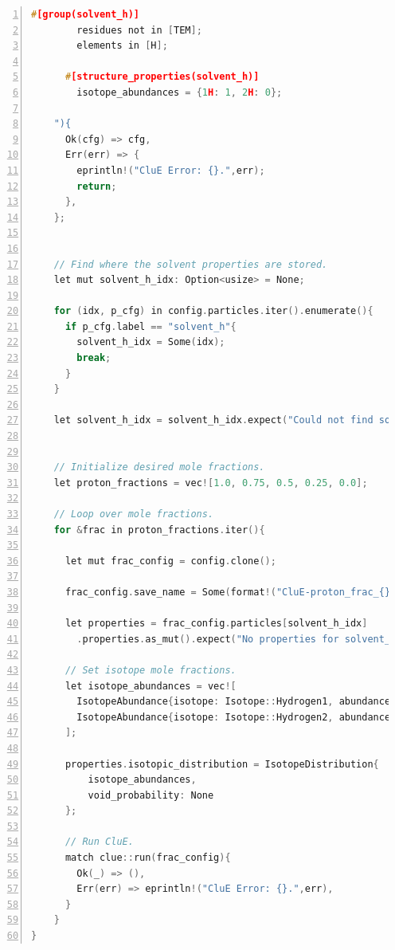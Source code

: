 \documentclass{book}
\begin{document}
\begin{lstlisting}[frame=single,numbers=left,language=c]
      #[group(solvent_h)]
        residues not in [TEM];
        elements in [H];

      #[structure_properties(solvent_h)]
        isotope_abundances = {1H: 1, 2H: 0};

    "){
      Ok(cfg) => cfg,
      Err(err) => {
        eprintln!("CluE Error: {}.",err);
        return;
      },
    };

 
    // Find where the solvent properties are stored.
    let mut solvent_h_idx: Option<usize> = None;

    for (idx, p_cfg) in config.particles.iter().enumerate(){
      if p_cfg.label == "solvent_h"{
        solvent_h_idx = Some(idx);
        break;
      }
    }

    let solvent_h_idx = solvent_h_idx.expect("Could not find solvent_h_idx.");


    // Initialize desired mole fractions.
    let proton_fractions = vec![1.0, 0.75, 0.5, 0.25, 0.0];

    // Loop over mole fractions.
    for &frac in proton_fractions.iter(){
      
      let mut frac_config = config.clone();

      frac_config.save_name = Some(format!("CluE-proton_frac_{}",frac));

      let properties = frac_config.particles[solvent_h_idx]
        .properties.as_mut().expect("No properties for solvent_h");

      // Set isotope mole fractions.
      let isotope_abundances = vec![
        IsotopeAbundance{isotope: Isotope::Hydrogen1, abundance: frac},
        IsotopeAbundance{isotope: Isotope::Hydrogen2, abundance: 1.0 - frac},
      ];

      properties.isotopic_distribution = IsotopeDistribution{
          isotope_abundances,
          void_probability: None
      };

      // Run CluE.
      match clue::run(frac_config){
        Ok(_) => (),
        Err(err) => eprintln!("CluE Error: {}.",err),
      }
    }
}
\end{lstlisting}
%
\end{document}
